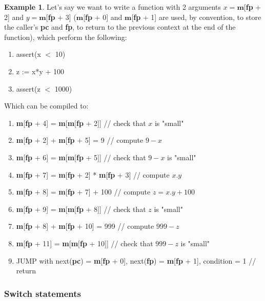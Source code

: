 \documentclass{article}
\theoremstyle{definition}
\newtheorem{exmp}{Example}[section]
\begin{document}
\begin{exmp}
	Let's say we want to write a function with 2 arguments $x = \textbf{m}$[\textbf{fp} + 2] and $y = \textbf{m}$[\textbf{fp} + 3] ($\textbf{m}$[\textbf{fp} + 0] and $\textbf{m}$[\textbf{fp} + 1] are used, by convention, to store the caller's \textbf{pc} and \textbf{fp}, to return to the previous context at the end of the function), which perform the following:
	
	\begin{enumerate}
		\item assert(x $<$ 10)
		\item z := x*y + 100
		\item assert(z $<$ 1000)
	\end{enumerate}
	
	Which can be compiled to:
	
	\begin{enumerate}
		\item \textbf{m}[\textbf{fp} + 4] = \textbf{m}[\textbf{m}$\big[$\textbf{fp} + 2$\big]$] // check that $x$ is "small"
		\item \textbf{m}[\textbf{fp} + 2] + \textbf{m}[\textbf{fp} + 5] = 9 // compute $9 - x$
		\item \textbf{m}[\textbf{fp} + 6] = \textbf{m}[\textbf{m}$\big[$\textbf{fp} + 5$\big]$] // check that $9 - x$ is "small"
		\item \textbf{m}[\textbf{fp} + 7] = \textbf{m}[\textbf{fp} + 2] * \textbf{m}[\textbf{fp} + 3] // compute $x.y$
		\item \textbf{m}[\textbf{fp} + 8] = \textbf{m}[\textbf{fp} + 7] + 100 // compute $z = x.y + 100$
		\item \textbf{m}[\textbf{fp} + 9] = \textbf{m}[\textbf{m}$\big[$\textbf{fp} + 8$\big]$] // check that $z$ is "small"
		\item \textbf{m}[\textbf{fp} + 8] + \textbf{m}[\textbf{fp} + 10] = 999 // compute $999 - z$
		\item \textbf{m}[\textbf{fp} + 11] = \textbf{m}[\textbf{m}$\big[$\textbf{fp} + 10$\big]$] // check that $999 - z$ is "small"
		\item JUMP with next(\textbf{pc}) = \textbf{m}[\textbf{fp} + 0], next(\textbf{fp}) = \textbf{m}[\textbf{fp} + 1], condition = 1 // return
	\end{enumerate}
	
	 
\end{exmp}


\subsubsection{Switch statements}
\end{document}
